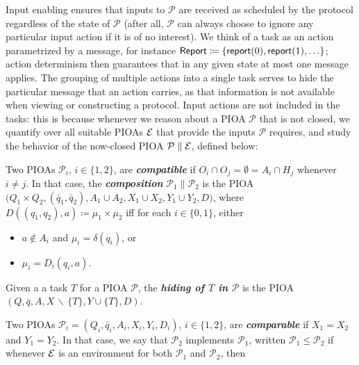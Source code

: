 \documentclass[10pt]{article}
\begin{document}
Input enabling ensures that inputs to $\mathcal{P}$ are received as scheduled by the protocol regardless of the state of $\mathcal{P}$ (after all, $\mathcal{P}$ can always choose to ignore any particular input action if it is of no interest). We think of a task as an action parametrized by a message, for instance $\mathsf{Report} \coloneqq \{\mathsf{report}(0),\mathsf{report}(1), \ldots\}$; action determinism then guarantees that in any given state at most one message applies. The grouping of multiple actions into a single task serves to hide the particular message that an action carries, as that information is not available when viewing or constructing a protocol. Input actions are not included in the tasks: this is because whenever we reason about a PIOA $\mathcal{P}$ that is not closed, we quantify over all suitable PIOAs $\mathcal{E}$ that provide the inputs $\mathcal{P}$ requires, and study the behavior of the now-closed PIOA $\mathcal{P} \parallel \mathcal{E}$, defined below:

\begin{definition}
Two PIOAs $\mathcal{P}_i$, $i \in \{1,2\}$, are \emph{\textbf{compatible}} if $O_i \cap O_j = \emptyset = A_i \cap H_j$ whenever $i \neq j$. In that case, the \emph{\textbf{composition}} $\mathcal{P}_1 \parallel \mathcal{P}_2$ is the PIOA $\big(Q_1 \times Q_2, (\bar{q}_1,\bar{q}_2), A_1 \cup A_2, X_1 \cup X_2, Y_1 \cup Y_2, D\big)$, where $D((q_1,q_2),a) \coloneqq \mu_1 \times \mu_2$ iff for each $i \in \{0,1\}$, either 
\begin{itemize}
\item $a \notin A_i$ and $\mu_i = \delta(q_i)$, or
\item $\mu_i = D_i(q_i,a)$.  
\end{itemize}
\end{definition}

\begin{definition}
Given a a task $T$ for a PIOA $\mathcal{P}$, the \textbf{\emph{hiding of $T$ in $\mathcal{P}$}} is the PIOA $(Q,\bar{q},A,X\,\backslash\,\{T\}, Y \cup \{T\}, D)$.
\end{definition}

\begin{definition}
Two PIOAs $\mathcal{P}_i = (Q_i, \bar{q}_i, A_i,X_i,Y_i,D_i)$, $i \in \{1,2\}$, are \emph{\textbf{comparable}} if $X_1 = X_2$ and $Y_1 = Y_2$. In that case, we say that $\mathcal{P}_2$ implements $\mathcal{P}_1$, written $\mathcal{P}_1 \leq \mathcal{P}_2$ if whenever $\mathcal{E}$ is an environment for both $\mathcal{P}_1$ and $\mathcal{P}_2$, then   
\end{definition}
\end{document}
